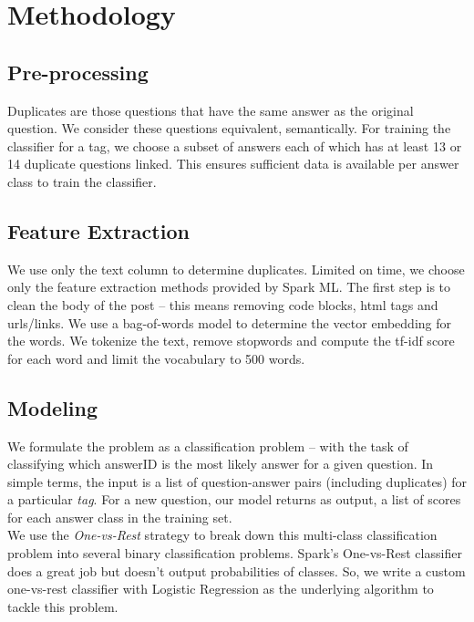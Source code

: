 \documentclass{article}
\begin{document}
\section{Methodology}
\subsection{Pre-processing}
Duplicates are those questions that have the same answer as the original question. We consider these questions equivalent, semantically. For training the classifier for a tag, we choose a subset of answers each of which has at least 13 or 14 duplicate questions linked. This ensures sufficient data is available per answer class to train the classifier.

\subsection{Feature Extraction}
We use only the text column to determine duplicates. Limited on time, we choose only the feature extraction methods provided by Spark ML. The first step is to clean the body of the post -- this means removing code blocks, html tags and urls/links. We use a bag-of-words model to determine the vector embedding for the words. We tokenize the text, remove stopwords and compute the tf-idf score for each word and limit the vocabulary to 500 words.

\subsection{Modeling}
We formulate the problem as a classification problem -- with the task of classifying which answerID is the most likely answer for a given question. In simple terms, the input is a list of question-answer pairs (including duplicates) for a particular \textit{tag}. For a new question, our model returns as output, a list of scores for each answer class in the training set.\\

We use the \textit{One-vs-Rest} strategy to break down this multi-class classification problem into several binary classification problems. Spark's One-vs-Rest classifier does a great job but doesn't output probabilities of classes. So, we write a custom one-vs-rest classifier with Logistic Regression as the underlying algorithm to tackle this problem.\\
\end{document}
